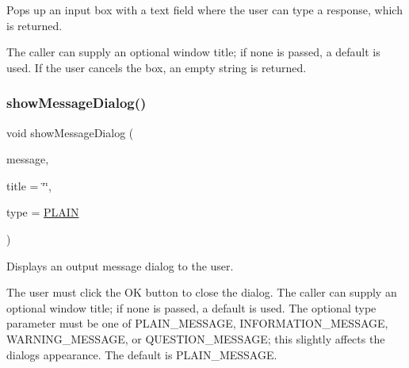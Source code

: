 Pops up an input box with a text field where the user can type a response, which is returned. 

The caller can supply an optional window title; if none is passed, a default is used. If the user cancels the box, an empty string is returned. \mbox{\label{classGOptionPane_ac72936da553721b532ea51a831a2993a}} 
\subsubsection{\texorpdfstring{show\+Message\+Dialog()}{showMessageDialog()}\hspace{0.1cm}{\footnotesize\ttfamily [1/3]}}
{\footnotesize\ttfamily void show\+Message\+Dialog (\begin{DoxyParamCaption}\item[{const std\+::string \&}]{message,  }\item[{const std\+::string \&}]{title = {\ttfamily \char`\"{}\char`\"{}},  }\item[{\mbox{\hyperlink{classGOptionPane_ac6606ebe91c8ac66a2c314c79f5ab013}{Message\+Type}}}]{type = {\ttfamily \mbox{\hyperlink{classGOptionPane_ac6606ebe91c8ac66a2c314c79f5ab013a8386f3e3e7be0b7b603636867c133a5d}{P\+L\+A\+IN}}} }\end{DoxyParamCaption})\hspace{0.3cm}{\ttfamily [static]}}



Displays an output message dialog to the user. 

The user must click the \textquotesingle{}OK\textquotesingle{} button to close the dialog. The caller can supply an optional window title; if none is passed, a default is used. The optional \textquotesingle{}type\textquotesingle{} parameter must be one of P\+L\+A\+I\+N\+\_\+\+M\+E\+S\+S\+A\+GE, I\+N\+F\+O\+R\+M\+A\+T\+I\+O\+N\+\_\+\+M\+E\+S\+S\+A\+GE, W\+A\+R\+N\+I\+N\+G\+\_\+\+M\+E\+S\+S\+A\+GE, or Q\+U\+E\+S\+T\+I\+O\+N\+\_\+\+M\+E\+S\+S\+A\+GE; this slightly affects the dialog\textquotesingle{}s appearance. The default is P\+L\+A\+I\+N\+\_\+\+M\+E\+S\+S\+A\+GE. \mbox{\label{classGOptionPane_a72a54f763487c83c587a79611e8ae685}} 
